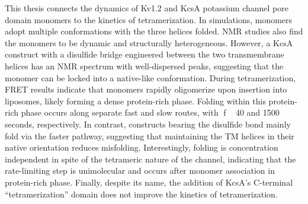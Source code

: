 \documentclass{ucetd}
\begin{document}
\abstract
\par
This thesis connects the dynamics of Kv1.2 and KcsA potassium channel pore domain monomers to the kinetics of tetramerization. In simulations, monomers adopt multiple conformations with the three helices folded. NMR studies also find the monomers to be dynamic and structurally heterogeneous. However, a KcsA construct with a disulfide bridge engineered between the two transmembrane helices has an NMR spectrum with well-dispersed peaks, suggesting that the monomer can be locked into a native-like conformation. During tetramerization, FRET results indicate that monomers rapidly oligomerize upon insertion into liposomes, likely forming a dense protein-rich phase. Folding within this protein-rich phase occurs along separate fast and slow routes, with f ~ 40 and 1500 seconds, respectively. In contrast, constructs bearing the disulfide bond mainly fold via the faster pathway, suggesting that maintaining the TM helices in their native orientation reduces misfolding. Interestingly, folding is concentration independent in spite of the tetrameric nature of the channel, indicating that the rate-limiting step is unimolecular and occurs after monomer association in protein-rich phase. Finally, despite its name, the addition of KcsA’s C-terminal “tetramerization” domain does not improve the kinetics of tetramerization.

\mainmatter






\makebibliography

%
%
\end{document}
